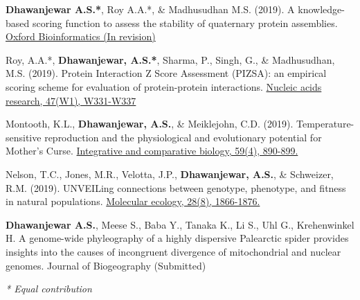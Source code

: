 


\begin{cvpubs}

\vspace{-1mm}


  \pubentry
    {\textbf{Dhawanjewar A.S.*}, Roy A.A.*, \& Madhusudhan M.S. (2019).}
	{A knowledge-based scoring function to assess the stability of quaternary protein assemblies.}
	{\href{https://doi.org/10.1101/562520}{Oxford Bioinformatics (In revision)}} 
	
  \pubentry
     {Roy, A.A.*, \textbf{Dhawanjewar, A.S.*}, Sharma, P., Singh, G., \& Madhusudhan, M.S. (2019).}
  	{Protein Interaction Z Score Assessment (PIZSA): an empirical scoring scheme for evaluation of protein-protein interactions.} 
	{\href{https://doi.org/10.1093/nar/gkz368}{Nucleic acids research, 47(W1), W331-W337}}

  \pubentry
    {Montooth, K.L., \textbf{Dhawanjewar, A.S.}, \& Meiklejohn, C.D. (2019).}
	{Temperature-sensitive reproduction and the physiological and evolutionary potential for Mother's Curse.}	{\href{https://doi.org/10.1093/icb/icz091}{Integrative and comparative biology, 59(4), 890-899.}}

  \pubentry
    {Nelson, T.C., Jones, M.R., Velotta, J.P., \textbf{Dhawanjewar, A.S.}, \& Schweizer, R.M. (2019).}
	{UNVEILing connections between genotype, phenotype, and fitness in natural populations.}
	{\href{https://doi.org/10.1111/mec.15067}{Molecular ecology, 28(8), 1866-1876.}}
	
  \pubentry
  	{\textbf{Dhawanjewar A.S.}, Meese S., Baba Y., Tanaka K., Li S., Uhl G., Krehenwinkel H.}
  	{A genome-wide phyleography of a highly dispersive Palearctic spider provides insights into the causes of incongruent divergence of mitochondrial and nuclear genomes.}
  	{Journal of Biogeography (Submitted)}
	
	\fontsize{10pt}{1em}\bodyfontlight\itshape\color{graytext} * Equal contribution

\end{cvpubs}



 \\


